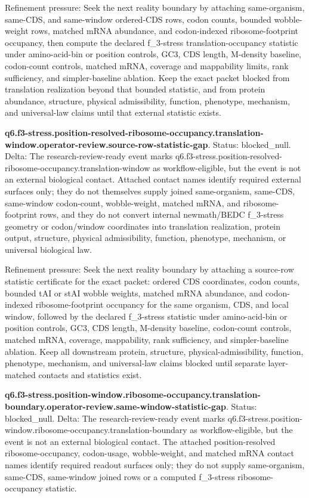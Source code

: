 Refinement pressure: Seek the next reality boundary by attaching same-organism, same-CDS, and same-window ordered-CDS rows, codon counts, bounded wobble-weight rows, matched mRNA abundance, and codon-indexed ribosome-footprint occupancy, then compute the declared f\_3-stress translation-occupancy statistic under amino-acid-bin or position controls, GC3, CDS length, M-density baseline, codon-count controls, matched mRNA, coverage and mappability limits, rank sufficiency, and simpler-baseline ablation. Keep the exact packet blocked from translation realization beyond that bounded statistic, and from protein abundance, structure, physical admissibility, function, phenotype, mechanism, and universal-law claims until that external statistic exists.

\textbf{q6.f3-stress.position-resolved-ribosome-occupancy.translation-window.operator-review.source-row-statistic-gap}. Status: blocked\_null. Delta: The research-review-ready event marks q6.f3-stress.position-resolved-ribosome-occupancy.translation-window as workflow-eligible, but the event is not an external biological contact. Attached contact names identify required external surfaces only; they do not themselves supply joined same-organism, same-CDS, same-window codon-count, wobble-weight, matched mRNA, and ribosome-footprint rows, and they do not convert internal newmath/BEDC f\_3-stress geometry or codon/window coordinates into translation realization, protein output, structure, physical admissibility, function, phenotype, mechanism, or universal biological law.

Refinement pressure: Seek the next reality boundary by attaching a source-row statistic certificate for the exact packet: ordered CDS coordinates, codon counts, bounded tAI or stAI wobble weights, matched mRNA abundance, and codon-indexed ribosome-footprint occupancy for the same organism, CDS, and local window, followed by the declared f\_3-stress statistic under amino-acid-bin or position controls, GC3, CDS length, M-density baseline, codon-count controls, matched mRNA, coverage, mappability, rank sufficiency, and simpler-baseline ablation. Keep all downstream protein, structure, physical-admissibility, function, phenotype, mechanism, and universal-law claims blocked until separate layer-matched contacts and statistics exist.

\textbf{q6.f3-stress.position-window.ribosome-occupancy.translation-boundary.operator-review.same-window-statistic-gap}. Status: blocked\_null. Delta: The research-review-ready event marks q6.f3-stress.position-window.ribosome-occupancy.translation-boundary as workflow-eligible, but the event is not an external biological contact. The attached position-resolved ribosome-occupancy, codon-usage, wobble-weight, and matched mRNA contact names identify required readout surfaces only; they do not supply same-organism, same-CDS, same-window joined rows or a computed f\_3-stress ribosome-occupancy statistic.

